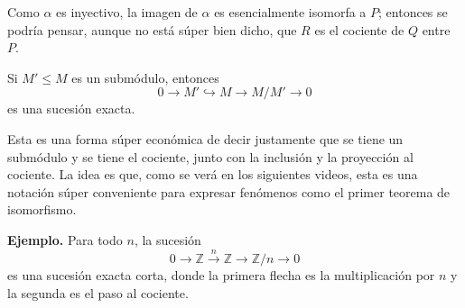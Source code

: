 \documentclass[11pt]{article}
\begin{document}
Como $\alpha$ es inyectivo, la imagen de $\alpha$ es esencialmente isomorfa a $P$; entonces se podría pensar, aunque no está súper bien dicho, que $R$ es el cociente de $Q$ entre $P$.

\begin{teo}\label{teo:primer-iso}
Si $M'\le M$ es un submódulo, entonces
\[
  0\longrightarrow M'\hookrightarrow M\longrightarrow M/M'\longrightarrow0
\]
es una sucesión exacta.
\end{teo}

Esta es una forma súper económica de decir justamente que se tiene un submódulo y se tiene el cociente, junto con la inclusión y la proyección al cociente. La idea es que, como se verá en los siguientes videos, esta es una notación súper conveniente para expresar fenómenos como el primer teorema de isomorfismo.

\medskip\noindent\textbf{Ejemplo.} Para todo $n$, la sucesión
\[
  0\longrightarrow\mathbb Z\xrightarrow{\ n\ }\mathbb Z\longrightarrow\mathbb Z/n\longrightarrow0
\]
es una sucesión exacta corta, donde la primera flecha es la multiplicación por $n$ y la segunda es el paso al cociente.

\begin{erratas}
\end{erratas}
\end{document}
